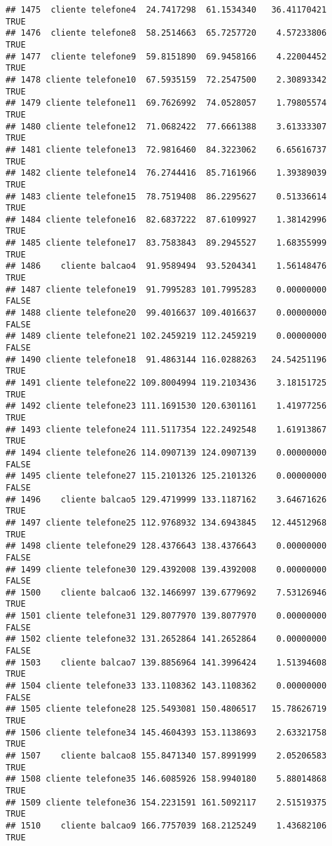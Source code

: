\documentclass[
]{article}
\begin{document}
\begin{verbatim}
## 1475  cliente telefone4  24.7417298  61.1534340   36.41170421     TRUE
## 1476  cliente telefone8  58.2514663  65.7257720    4.57233806     TRUE
## 1477  cliente telefone9  59.8151890  69.9458166    4.22004452     TRUE
## 1478 cliente telefone10  67.5935159  72.2547500    2.30893342     TRUE
## 1479 cliente telefone11  69.7626992  74.0528057    1.79805574     TRUE
## 1480 cliente telefone12  71.0682422  77.6661388    3.61333307     TRUE
## 1481 cliente telefone13  72.9816460  84.3223062    6.65616737     TRUE
## 1482 cliente telefone14  76.2744416  85.7161966    1.39389039     TRUE
## 1483 cliente telefone15  78.7519408  86.2295627    0.51336614     TRUE
## 1484 cliente telefone16  82.6837222  87.6109927    1.38142996     TRUE
## 1485 cliente telefone17  83.7583843  89.2945527    1.68355999     TRUE
## 1486    cliente balcao4  91.9589494  93.5204341    1.56148476     TRUE
## 1487 cliente telefone19  91.7995283 101.7995283    0.00000000    FALSE
## 1488 cliente telefone20  99.4016637 109.4016637    0.00000000    FALSE
## 1489 cliente telefone21 102.2459219 112.2459219    0.00000000    FALSE
## 1490 cliente telefone18  91.4863144 116.0288263   24.54251196     TRUE
## 1491 cliente telefone22 109.8004994 119.2103436    3.18151725     TRUE
## 1492 cliente telefone23 111.1691530 120.6301161    1.41977256     TRUE
## 1493 cliente telefone24 111.5117354 122.2492548    1.61913867     TRUE
## 1494 cliente telefone26 114.0907139 124.0907139    0.00000000    FALSE
## 1495 cliente telefone27 115.2101326 125.2101326    0.00000000    FALSE
## 1496    cliente balcao5 129.4719999 133.1187162    3.64671626     TRUE
## 1497 cliente telefone25 112.9768932 134.6943845   12.44512968     TRUE
## 1498 cliente telefone29 128.4376643 138.4376643    0.00000000    FALSE
## 1499 cliente telefone30 129.4392008 139.4392008    0.00000000    FALSE
## 1500    cliente balcao6 132.1466997 139.6779692    7.53126946     TRUE
## 1501 cliente telefone31 129.8077970 139.8077970    0.00000000    FALSE
## 1502 cliente telefone32 131.2652864 141.2652864    0.00000000    FALSE
## 1503    cliente balcao7 139.8856964 141.3996424    1.51394608     TRUE
## 1504 cliente telefone33 133.1108362 143.1108362    0.00000000    FALSE
## 1505 cliente telefone28 125.5493081 150.4806517   15.78626719     TRUE
## 1506 cliente telefone34 145.4604393 153.1138693    2.63321758     TRUE
## 1507    cliente balcao8 155.8471340 157.8991999    2.05206583     TRUE
## 1508 cliente telefone35 146.6085926 158.9940180    5.88014868     TRUE
## 1509 cliente telefone36 154.2231591 161.5092117    2.51519375     TRUE
## 1510    cliente balcao9 166.7757039 168.2125249    1.43682106     TRUE

\end{verbatim}
\end{document}
